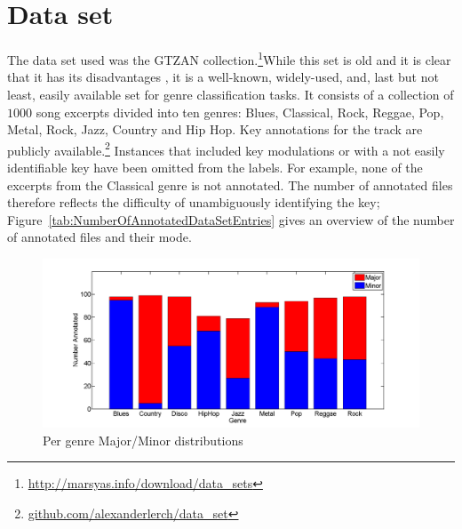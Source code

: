 \documentclass{article}
\begin{document}

\section{Data set}\label{sec:dataset}
The data set used was the GTZAN collection.\footnote{\url{http://marsyas.info/download/data_sets}}While this set is old and it is clear that it has its disadvantages \cite{sturm_analysis_2012}, it is a well-known, widely-used, and, last but not least, easily available set for genre classification tasks. It consists of a collection of $1000$ song excerpts divided into ten genres: Blues, Classical, Rock, Reggae, Pop, Metal, Rock, Jazz, Country and Hip Hop. 
Key annotations for the track are publicly available.\footnote{\url{github.com/alexanderlerch/data_set}} Instances that included key modulations or with a not easily identifiable key have been omitted from the labels. For example, none of the excerpts from the Classical genre is not annotated. 
The number of annotated files therefore reflects the difficulty of unambiguously identifying the key; Figure~\ref{tab:NumberOfAnnotatedDataSetEntries} gives an overview of the number of annotated files and their mode. 

\begin{figure}[tb]\label{tab:NumberOfAnnotatedDataSetEntries}
    \includegraphics[scale=.2]{graph/annotated}
	\caption{Per genre Major/Minor distributions}
	\label{fig:confPC+MFCC}
\end{figure}
\end{document}
